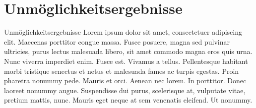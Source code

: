 \section{Unmöglichkeitsergebnisse}

\begin{frame}{Unmöglichkeitsergebnisse}
	Lorem ipsum dolor sit amet, consectetuer adipiscing elit. Maecenas porttitor congue massa. Fusce posuere, magna sed pulvinar ultricies, purus lectus malesuada libero, sit amet commodo magna eros quis urna.
	Nunc viverra imperdiet enim. Fusce est. Vivamus a tellus.
	Pellentesque habitant morbi tristique senectus et netus et malesuada fames ac turpis egestas. Proin pharetra nonummy pede. Mauris et orci.
	Aenean nec lorem. In porttitor. Donec laoreet nonummy augue.
	Suspendisse dui purus, scelerisque at, vulputate vitae, pretium mattis, nunc. Mauris eget neque at sem venenatis eleifend. Ut nonummy.      
\end{frame}